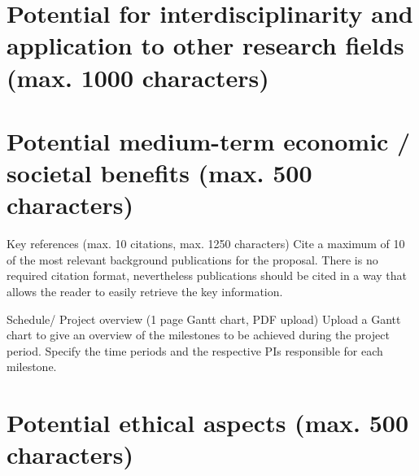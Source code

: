 \documentclass[a4paper,12pt]{article}
\begin{document}
\section{Potential for interdisciplinarity and application to other research fields (max. 1000 characters)}

\section{Potential medium-term economic / societal benefits (max. 500 characters)}

Key references (max. 10 citations, max. 1250 characters)
Cite a maximum of 10 of the most relevant background publications for the proposal. There is no required citation format, nevertheless publications should be cited in a way that allows the reader to easily retrieve the key information.

Schedule/ Project overview (1 page Gantt chart, PDF upload)
Upload a Gantt chart to give an overview of the milestones to be achieved during the project period. Specify the time periods and the respective PIs responsible for each milestone.

\section{Potential ethical aspects (max. 500 characters)}

\end{document}
